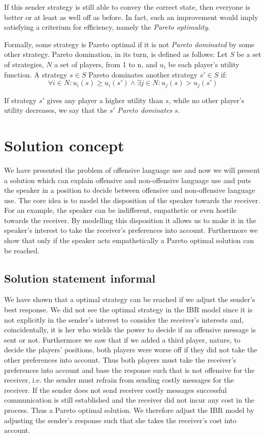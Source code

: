 \documentclass[10]{article}
\begin{document}
If this sender strategy is still able to convey the correct state, then everyone is better or at least as well off as before. In fact, such an improvement would imply satisfying a criterium for efficiency, namely the  \textit{Pareto optimality}.

Formally, some strategy is Pareto optimal if it is not \textit{Pareto dominated} by some other strategy. Pareto domination, in its turn, is defined as follows:
Let $S$ be a set of strategies, $N$ a set of players, from 1 to n, and $u_i$ be each player's utility function. A strategy $s \in S$ Pareto dominates another strategy $s' \in S$ if:
\begin{equation*}
\forall i \in N: u_i(s) \geq u_i(s') \land \exists j \in N: u_j(s) > u_j(s')
\end{equation*}

If strategy $s'$ gives any player a higher utility than $s$, while no other player's utility decreases, we say that the $s'$ \textit{Pareto dominates} $s$.


\section{Solution concept}
We have presented the problem of offensive language use and now we will present a solution which can explain offensive and non-offensive language use and puts the speaker in a position to decide between offensive and non-offensive language use. The core idea is to model the disposition of the speaker towards the receiver. For an example, the speaker can be indifferent, empathetic or even hostile towards the receiver. By modelling this disposition it allows us to make it in the speaker's interest to take the receiver's preferences into account. Furthermore we show that only if the speaker acts empathetically a Pareto optimal solution can be reached.

\subsection{Solution statement informal}
We have shown that a optimal strategy can be reached if we adjust the sender's best response. We did not see the optimal strategy in the IBR model since it is not explicitly in the sender's interest to consider the receiver's interests and, coincidentally, it is her who wields the power to decide if an offensive message is sent or not. Furthermore we saw that if we added a third player, nature, to decide the players' positions, both players were worse off if they did not take the other preferences into account. Thus both players must take the receiver's preferences into account and base the response such that is not offensive for the receiver, i.e. the sender must refrain from sending costly messages for the receiver. If the sender does not send receiver costly messages successful communication is still established and the receiver did not incur any cost in the process. Thus a Pareto optimal solution. We therefore adjust the IBR model by adjusting the sender's response such that she takes the receiver's cost into account.
\end{document}
